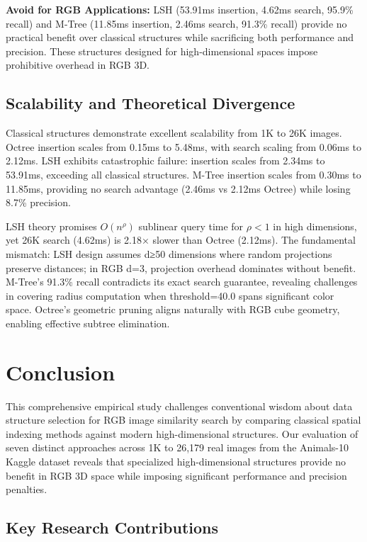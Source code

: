 \documentclass{sbc2023}
\begin{document}
\textbf{Avoid for RGB Applications:} LSH (53.91ms insertion, 4.62ms search, 95.9\% recall) and M-Tree (11.85ms insertion, 2.46ms search, 91.3\% recall) provide no practical benefit over classical structures while sacrificing both performance and precision. These structures designed for high-dimensional spaces impose prohibitive overhead in RGB 3D.

\subsection{Scalability and Theoretical Divergence}

Classical structures demonstrate excellent scalability from 1K to 26K images. Octree insertion scales from 0.15ms to 5.48ms, with search scaling from 0.06ms to 2.12ms. LSH exhibits catastrophic failure: insertion scales from 2.34ms to 53.91ms, exceeding all classical structures. M-Tree insertion scales from 0.30ms to 11.85ms, providing no search advantage (2.46ms vs 2.12ms Octree) while losing 8.7\% precision.

LSH theory promises $O(n^\rho)$ sublinear query time for $\rho < 1$ in high dimensions, yet 26K search (4.62ms) is 2.18× slower than Octree (2.12ms). The fundamental mismatch: LSH design assumes d≥50 dimensions where random projections preserve distances; in RGB d=3, projection overhead dominates without benefit. M-Tree's 91.3\% recall contradicts its exact search guarantee, revealing challenges in covering radius computation when threshold=40.0 spans significant color space. Octree's geometric pruning aligns naturally with RGB cube geometry, enabling effective subtree elimination.


\section{Conclusion}
\label{sec:conclusion}

This comprehensive empirical study challenges conventional wisdom about data structure selection for RGB image similarity search by comparing classical spatial indexing methods against modern high-dimensional structures. Our evaluation of seven distinct approaches across 1K to 26,179 real images from the Animals-10 Kaggle dataset reveals that specialized high-dimensional structures provide no benefit in RGB 3D space while imposing significant performance and precision penalties.

\subsection{Key Research Contributions}
\end{document}
